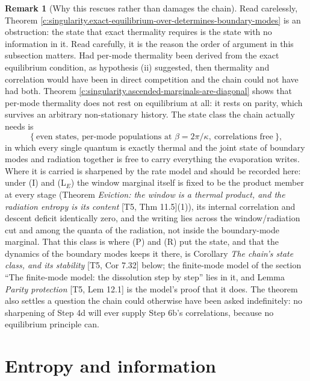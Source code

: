 \documentclass[11pt]{article}
\theoremstyle{definition}
\newtheorem{remark}[theorem]{Remark}
\theoremstyle{plain}
\begin{document}
\begin{remark}[Why this rescues rather than damages the chain]\label{c:note.singularity.why-rescues-rather-than-damages-chain}
Read carelessly, Theorem \ref{c:singularity.exact-equilibrium-over-determines-boundary-modes} is an obstruction: the state that exact thermality requires is the state with no information in it. Read carefully, it is the reason the order of argument in this subsection matters. Had per-mode thermality been derived from the exact equilibrium condition, as hypothesis (ii) suggested, then thermality and correlation would have been in direct competition and the chain could not have had both. Theorem \ref{c:singularity.ascended-marginals-are-diagonal} shows that per-mode thermality does not rest on equilibrium at all: it rests on parity, which survives an arbitrary non-stationary history. The state class the chain actually needs is
\[
\bigl\{\ \text{even states, per-mode populations at } \beta = 2\pi/\kappa, \ \text{correlations free}\ \bigr\},
\]
in which every single quantum is exactly thermal and the joint state of boundary modes and radiation together is free to carry everything the evaporation writes. Where it is carried is sharpened by the rate model and should be recorded here: under (I) and (L$_E$) the window marginal itself is fixed to be the product member at every stage (Theorem \emph{Eviction: the window is a thermal product, and the radiation entropy is its content} [T5, Thm 11.5](1)), its internal correlation and descent deficit identically zero, and the writing lies across the window/radiation cut and among the quanta of the radiation, not inside the boundary-mode marginal. That this class is where (P) and (R) put the state, and that the dynamics of the boundary modes keeps it there, is Corollary \emph{The chain's state class, and its stability} [T5, Cor 7.32] below; the finite-mode model of the section ``The finite-mode model: the dissolution step by step'' lies in it, and Lemma \emph{Parity protection} [T5, Lem 12.1] is the model's proof that it does. The theorem also settles a question the chain could otherwise have been asked indefinitely: no sharpening of Step 4d will ever supply Step 6b's correlations, because no equilibrium principle can.
\end{remark}

\section{Entropy and information}
\end{document}
